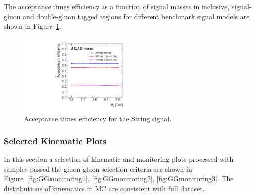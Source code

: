 \FloatBarrier

The acceptance times efficiency as a function of signal masses in inclusive, signal-gluon and double-gluon
tagged regions for different benchmark signal models are shown in Figure~\ref{fig:AccxEff}.

\begin{figure}[htb]
 \centering
 \includegraphics[width=0.5\textwidth]{fig/benchmark_signals/AccxEff_strings.pdf}
 \caption{Acceptance times efficiency for the String signal.}
 \label{fig:AccxEff}
\end{figure}
\FloatBarrier
\subsubsection{Selected Kinematic Plots}

In this section a selection of kinematic and monitoring plots processed with samples passed the gluon-gluon selection criteria are shown in Figure~\ref{fig:GGmonitoring1}, \ref{fig:GGmonitoring2}, \ref{fig:GGmonitoring3}. The distributions of kinematics in MC are consistent with full dataset.

